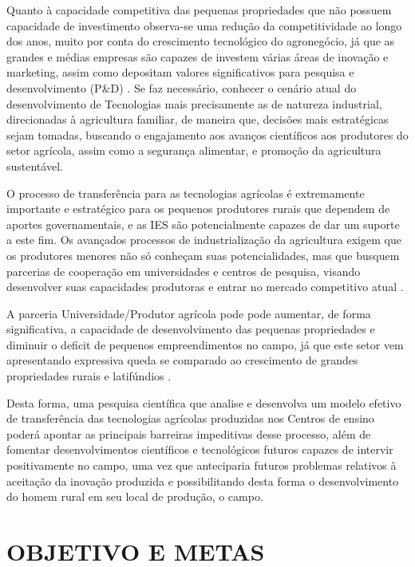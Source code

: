 Quanto à capacidade competitiva das pequenas propriedades que não possuem capacidade de investimento observa-se uma redução da competitividade ao longo dos anos, muito por conta do crescimento tecnológico do agronegócio, já que as grandes e médias empresas são capazes de investem várias áreas de inovação e marketing, assim como depositam valores significativos para pesquisa e desenvolvimento (P\&D) \cite{Kitchenko2019DecisionEquipment}. Se faz necessário, conhecer o cenário atual do desenvolvimento de Tecnologias  mais precisamente as de natureza industrial, direcionadas à agricultura familiar, de maneira que, decisões mais estratégicas sejam tomadas, buscando o engajamento aos avanços científicos aos produtores do setor agrícola, assim como a segurança alimentar, e promoção da agricultura sustentável.

O processo de transferência para as tecnologias agrícolas é extremamente importante e  estratégico para os pequenos produtores rurais que dependem de aportes governamentais, e as IES são potencialmente  capazes de dar um suporte a este fim. Os avançados processos de industrialização da agricultura exigem que os produtores menores não só conheçam suas potencialidades, mas que busquem parcerias de cooperação em universidades e centros de pesquisa, visando desenvolver suas capacidades produtoras e entrar no mercado competitivo atual \cite{Silva2016ModeloBrasileiros}.

A parceria Universidade/Produtor agrícola pode pode aumentar, de forma significativa, a capacidade de desenvolvimento das pequenas propriedades e diminuir o deficit de pequenos empreendimentos no campo, já que este setor vem apresentando expressiva queda se comparado ao crescimento de grandes propriedades rurais e latifúndios \cite{Culhane2016LearningEducation,Jabbour2019InstructorEducation,Gunasekera2018ExperiencesEducation}.

Desta forma, uma pesquisa científica que analise e desenvolva um modelo efetivo de transferência das tecnologias agrícolas produzidas nos Centros de ensino poderá apontar as principais barreiras impeditivas desse processo, além de fomentar desenvolvimentos científicos e tecnológicos futuros capazes de intervir positivamente no campo, uma vez que anteciparia futuros problemas relativos à aceitação da inovação produzida e possibilitando desta forma o desenvolvimento do homem rural em seu local de produção, o campo.

\section{OBJETIVO E METAS}

